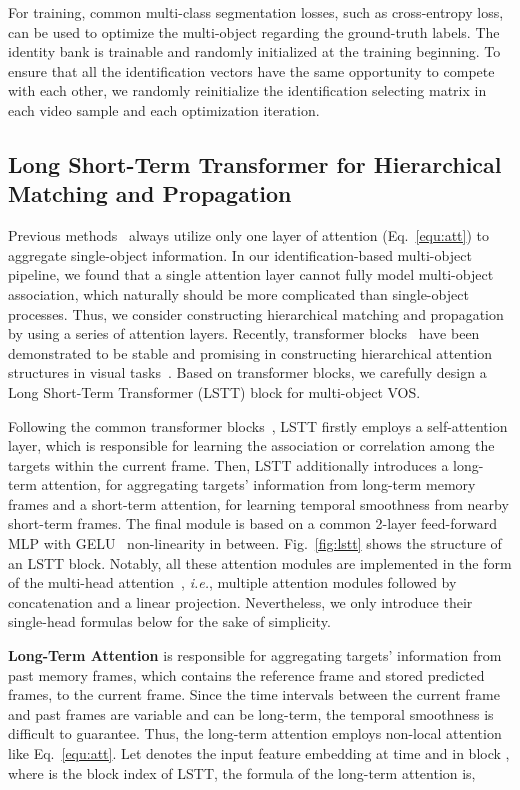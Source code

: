\documentclass{article}
\def\ie{\emph{i.e.}}
\begin{document}
For training, common multi-class segmentation losses, such as cross-entropy loss, can be used to optimize the multi-object  regarding the ground-truth labels. The identity bank  is trainable and randomly initialized at the training beginning. To ensure that all the identification vectors have the same opportunity to compete with each other, we randomly reinitialize the identification selecting matrix  in each video sample and each optimization iteration.

\subsection{Long Short-Term Transformer for Hierarchical Matching and Propagation}
Previous methods~\cite{spacetime,KMN} always utilize only one layer of attention (Eq.~\ref{equ:att}) to aggregate single-object information. In our identification-based multi-object pipeline, we found that a single attention layer cannot fully model multi-object association, which naturally should be more complicated than single-object processes. Thus, we consider constructing hierarchical matching and propagation by using a series of attention layers. Recently, transformer blocks~\cite{transformer} have been demonstrated to be stable and promising in constructing hierarchical attention structures in visual tasks~\cite{detr,vit}. Based on transformer blocks, we carefully design a Long Short-Term Transformer (LSTT) block for multi-object VOS.

Following the common transformer blocks~\cite{transformer,devlin2018bert}, LSTT firstly employs a self-attention layer, which is responsible for learning the association or correlation among the targets within the current frame. Then, LSTT additionally introduces a long-term attention, for aggregating targets' information from long-term memory frames and a short-term attention, for learning temporal smoothness from nearby short-term frames. The final module is based on a common 2-layer feed-forward MLP with GELU~\cite{gelu} non-linearity in between. Fig.~\ref{fig:lstt} shows the structure of an LSTT block. Notably, all these attention modules are implemented in the form of the multi-head attention~\cite{transformer}, \ie, multiple attention modules followed by concatenation and a linear projection. Nevertheless, we only introduce their single-head formulas below for the sake of simplicity.

\noindent\textbf{Long-Term Attention} is responsible for aggregating targets' information from past memory frames, which contains the reference frame and stored predicted frames, to the current frame. Since the time intervals between the current frame and past frames are variable and can be long-term, the temporal smoothness is difficult to guarantee. Thus, the long-term attention employs non-local attention like Eq.~\ref{equ:att}. Let  denotes the input feature embedding at time  and in block , where  is the block index of LSTT, the formula of the long-term attention is,
\end{document}
